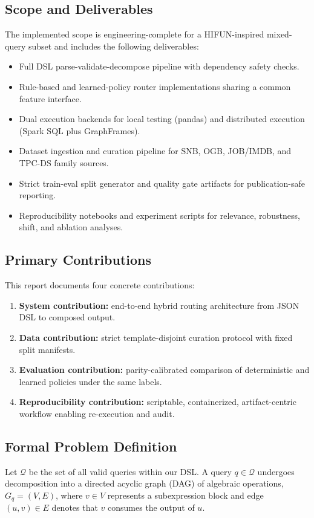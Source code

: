 \documentclass[conference]{IEEEtran}
\begin{document}
\subsection{Scope and Deliverables}
The implemented scope is engineering-complete for a HIFUN-inspired mixed-query subset and includes the following deliverables:
\begin{itemize}[leftmargin=*]
\item Full DSL parse-validate-decompose pipeline with dependency safety checks.
\item Rule-based and learned-policy router implementations sharing a common feature interface.
\item Dual execution backends for local testing (pandas) and distributed execution (Spark SQL plus GraphFrames).
\item Dataset ingestion and curation pipeline for SNB, OGB, JOB/IMDB, and TPC-DS family sources.
\item Strict train-eval split generator and quality gate artifacts for publication-safe reporting.
\item Reproducibility notebooks and experiment scripts for relevance, robustness, shift, and ablation analyses.
\end{itemize}

\subsection{Primary Contributions}
This report documents four concrete contributions:
\begin{enumerate}[leftmargin=*]
\item \textbf{System contribution:} end-to-end hybrid routing architecture from JSON DSL to composed output.
\item \textbf{Data contribution:} strict template-disjoint curation protocol with fixed split manifests.
\item \textbf{Evaluation contribution:} parity-calibrated comparison of deterministic and learned policies under the same labels.
\item \textbf{Reproducibility contribution:} scriptable, containerized, artifact-centric workflow enabling re-execution and audit.
\end{enumerate}

\subsection{Formal Problem Definition}
Let $\mathcal{Q}$ be the set of all valid queries within our DSL. A query $q \in \mathcal{Q}$ undergoes decomposition into a directed acyclic graph (DAG) of algebraic operations, $G_q = (V, E)$, where $v \in V$ represents a subexpression block and edge $(u, v) \in E$ denotes that $v$ consumes the output of $u$.
\end{document}
